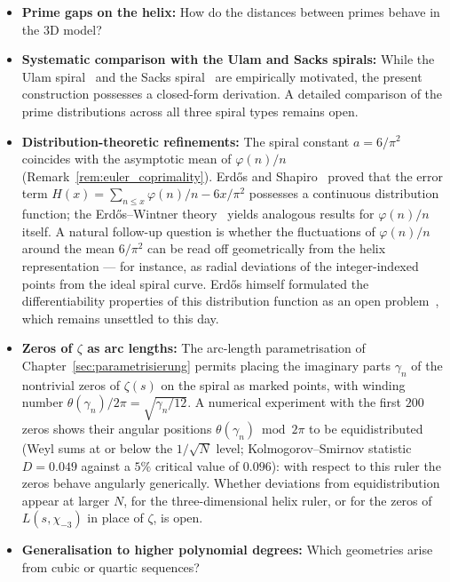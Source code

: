\begin{itemize}
\item \textbf{Prime gaps on the helix:}
  How do the distances between primes behave in the 3D model?

\item \textbf{Systematic comparison with the Ulam and Sacks spirals:}
  While the Ulam spiral~\cite{Stein1964} and the Sacks spiral~\cite{Sacks2003}
  are empirically motivated, the present construction possesses a closed-form
  derivation. A detailed comparison of the prime distributions
  across all three spiral types remains open.

\item \textbf{Distribution-theoretic refinements:}
  The spiral constant $a = 6/\pi^2$ coincides with the asymptotic mean
  of $\varphi(n)/n$ (Remark~\ref{rem:euler_coprimality}).
  Erd\H{o}s and Shapiro~\cite{ErdosShapiro1955} proved that the error
  term $H(x) = \sum_{n \leqslant x}\varphi(n)/n - 6x/\pi^2$ possesses
  a continuous distribution function; the Erd\H{o}s--Wintner
  theory~\cite{ErdosWintner1939} yields analogous results for
  $\varphi(n)/n$ itself. A natural follow-up question is whether the
  fluctuations of $\varphi(n)/n$ around the mean $6/\pi^2$ can be
  read off geometrically from the helix representation — for instance,
  as radial deviations of the integer-indexed points from the ideal
  spiral curve. Erd\H{o}s himself formulated the differentiability
  properties of this distribution function as an open
  problem~\cite{Erdos1974distribution}, which remains unsettled to
  this day.

\item \textbf{Zeros of $\zeta$ as arc lengths:}
  The arc-length parametrisation of Chapter~\ref{sec:parametrisierung}
  permits placing the imaginary parts $\gamma_n$ of the nontrivial
  zeros of $\zeta(s)$ on the spiral as marked points, with winding
  number $\theta(\gamma_n)/2\pi = \sqrt{\gamma_n/12}$. A numerical
  experiment with the first $200$ zeros shows their angular positions
  $\theta(\gamma_n) \bmod 2\pi$ to be equidistributed (Weyl sums at or
  below the $1/\sqrt{N}$ level; Kolmogorov--Smirnov statistic
  $D = 0.049$ against a $5\%$ critical value of $0.096$): with respect
  to this ruler the zeros behave angularly generically. Whether
  deviations from equidistribution appear at larger $N$, for the
  three-dimensional helix ruler, or for the zeros of $L(s,\chi_{-3})$
  in place of $\zeta$, is open.

\item \textbf{Generalisation to higher polynomial degrees:}
  Which geometries arise from cubic or quartic sequences?


\end{itemize}
